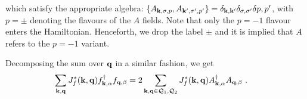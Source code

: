 \documentclass[%
reprint,
superscriptaddress,
groupedaddress,
superscriptaddress,
onecolumn,
10pt
]{revtex4-2}
\begin{document}
which satisfy the appropriate algebra: \(\left\{A_{{\bf k},\sigma, p}, A_{{\bf k}^\prime,\sigma^\prime, p^\prime}\right\} = \delta_{{\bf k},{\bf k}^\prime}\delta_{\sigma,\sigma^\prime}\delta{p, p^\prime}\), with \(p=\pm\) denoting the flavours of the \(A\) fields. Note that only the \(p=-1\) flavour enters the Hamiltonian. Henceforth, we drop the label \(\pm\) and it is implied that \(A\) refers to the \(p=-1\) variant.

Decomposing the sum over \({\bf q}\) in a similar fashion, we get
\begin{equation}\begin{aligned}\label{kondoAB}
	\sum_{{\bf k}, {\bf q}} J_f^*({\bf k},{\bf q}) f^\dagger_{{\bf k},\alpha}f_{{\bf q},\beta} 
	&= 2\sum_{{\bf k}, {\bf q} \in \mathcal{Q}_1, \mathcal{Q}_2} J_f^*({\bf k},{\bf q}) A^\dagger_{{\bf k},\alpha}A_{{\bf q},\beta}~.
\end{aligned}\end{equation}
\end{document}
